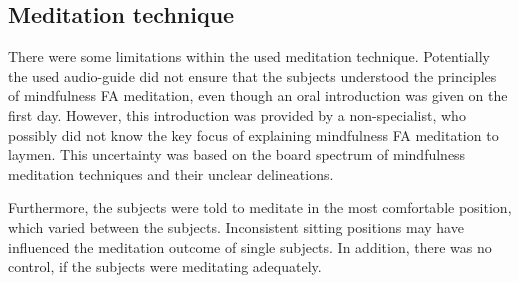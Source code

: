 \subsection{Meditation technique}

There were some limitations within the used meditation technique. Potentially the used audio-guide did not ensure that the subjects understood the principles of mindfulness FA meditation, even though an oral introduction was given on the first day. However, this introduction was provided by a non-specialist, who possibly did not know the key focus of explaining mindfulness FA meditation to laymen. This uncertainty was based on the board spectrum of mindfulness meditation techniques and their unclear delineations. 

Furthermore, the subjects were told to meditate in the most comfortable position, which varied between the subjects. Inconsistent sitting positions may have influenced the meditation outcome of single subjects. In addition, there was no control, if the subjects were meditating adequately.

